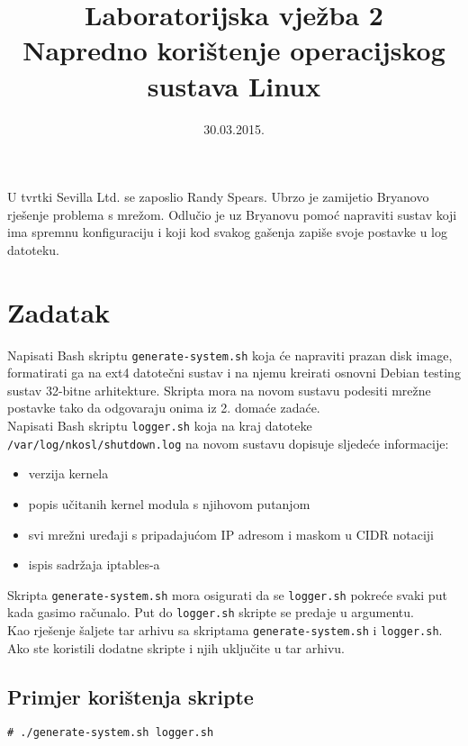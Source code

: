 \documentclass[12pt,a4paper]{article}
\begin{document}
	\title{Laboratorijska vježba 2\\{\large Napredno korištenje operacijskog sustava Linux}}
	\date{\vspace{-5ex} 30.03.2015.}
	\maketitle
	
	U tvrtki Sevilla Ltd. se zaposlio Randy Spears. Ubrzo je zamijetio Bryanovo rješenje problema s mrežom. Odlučio je uz Bryanovu pomoć napraviti sustav koji ima spremnu konfiguraciju i koji kod svakog gašenja zapiše svoje postavke u log datoteku.
	
	\section*{Zadatak}
	
	Napisati Bash skriptu \texttt{generate-system.sh} koja će napraviti prazan disk image, formatirati ga na ext4 datotečni sustav i na njemu kreirati osnovni Debian testing sustav 32-bitne arhitekture. Skripta mora na novom sustavu podesiti mrežne postavke tako da odgovaraju onima iz 2. domaće zadaće.\\
	
	Napisati Bash skriptu \texttt{logger.sh} koja na kraj datoteke \texttt{/var/log/nkosl/shutdown.log} na novom sustavu dopisuje sljedeće informacije: 
	\begin{itemize}
		\item verzija kernela
  		\item popis učitanih kernel modula s njihovom putanjom
  		\item svi mrežni uređaji s pripadajućom IP adresom i maskom u CIDR notaciji
  		\item ispis sadržaja iptables-a
  	\end{itemize}
	Skripta \texttt{generate-system.sh} mora osigurati da se \texttt{logger.sh} pokreće svaki put kada gasimo računalo. Put do \texttt{logger.sh} skripte se predaje u argumentu.\\
	
	Kao rješenje šaljete tar arhivu sa skriptama \texttt{generate-system.sh} i \texttt{logger.sh}. Ako ste koristili dodatne skripte i njih uključite u tar arhivu.
	
	\subsection*{Primjer korištenja skripte}
	\begin{verbatim}
# ./generate-system.sh logger.sh
	\end{verbatim}	
\end{document}

